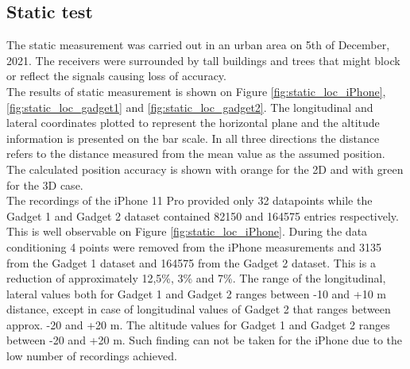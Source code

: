 \documentclass{article}
\begin{document}
		\subsection{Static test}
			The static measurement was carried out in an urban area on 5th of December, 2021. The receivers were surrounded by tall buildings and trees that might block or reflect the signals causing loss of accuracy. \\	
			The results of static measurement is shown on Figure \ref{fig:static_loc_iPhone}, \ref{fig:static_loc_gadget1} and \ref{fig:static_loc_gadget2}. The longitudinal and lateral coordinates plotted to represent the horizontal plane and the altitude information is presented on the bar scale. In all three directions the distance refers to the distance measured from the mean value as the assumed position. The calculated position accuracy is shown with orange for the 2D and with green for the 3D case. \\
			The recordings of the iPhone 11 Pro provided only 32 datapoints while the Gadget 1 and Gadget 2 dataset contained 82150 and 164575 entries respectively. This is well observable on Figure \ref{fig:static_loc_iPhone}. During the data conditioning 4 points were removed from the iPhone measurements and 3135 from the Gadget 1 dataset and 164575 from the Gadget 2 dataset. This is a reduction of approximately 12,5\%, 3\% and 7\%. The range of the longitudinal, lateral values both for Gadget 1 and Gadget 2 ranges between -10 and +10 m distance, except in case of longitudinal values of Gadget 2 that ranges between approx. -20 and +20 m. The altitude values for Gadget 1 and Gadget 2 ranges between -20 and +20 m. Such finding can not be taken for the iPhone due to the low number of recordings achieved.
\end{document}
